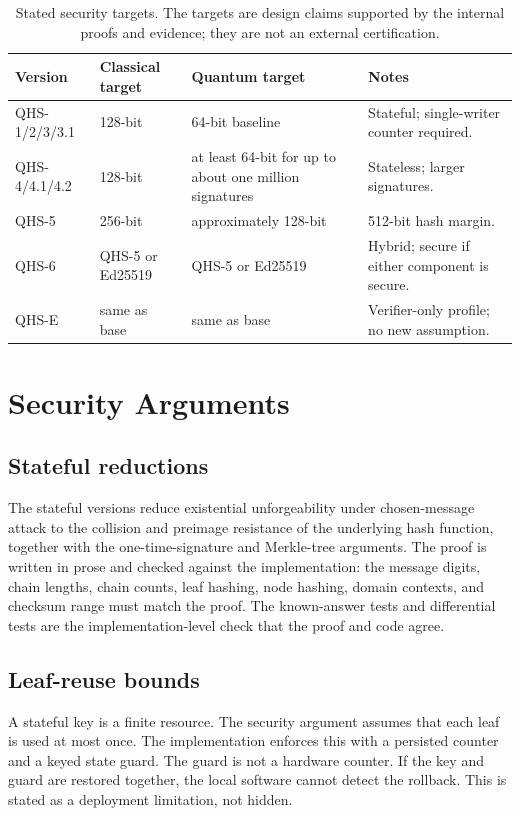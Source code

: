 \documentclass[11pt,a4paper]{article}
\begin{document}
\begin{table}[ht]
\centering
\caption{Stated security targets. The targets are design claims supported by
the internal proofs and evidence; they are not an external certification.}
\label{tab:security}
\footnotesize
\setlength{\tabcolsep}{4pt}
\begin{tabularx}{\textwidth}{@{}l l l Y@{}}
\toprule
Version & Classical target & Quantum target & Notes\\
\midrule
QHS-1/2/3/3.1 & 128-bit & 64-bit baseline & Stateful; single-writer counter required.\\
QHS-4/4.1/4.2 & 128-bit & at least 64-bit for up to about one million signatures & Stateless; larger signatures.\\
QHS-5 & 256-bit & approximately 128-bit & 512-bit hash margin.\\
QHS-6 & QHS-5 or Ed25519 & QHS-5 or Ed25519 & Hybrid; secure if either component is secure.\\
QHS-E & same as base & same as base & Verifier-only profile; no new assumption.\\
\bottomrule
\end{tabularx}
\end{table}
\FloatBarrier

\section{Security Arguments}

\subsection{Stateful reductions}

The stateful versions reduce existential unforgeability under chosen-message
attack to the collision and preimage resistance of the underlying hash
function, together with the one-time-signature and Merkle-tree arguments. The
proof is written in prose and checked against the implementation: the message
digits, chain lengths, chain counts, leaf hashing, node hashing, domain
contexts, and checksum range must match the proof. The known-answer tests and
differential tests are the implementation-level check that the proof and code
agree.

\subsection{Leaf-reuse bounds}

A stateful key is a finite resource. The security argument assumes that each
leaf is used at most once. The implementation enforces this with a persisted
counter and a keyed state guard. The guard is not a hardware counter. If the
key and guard are restored together, the local software cannot detect the
rollback. This is stated as a deployment limitation, not hidden.
\end{document}

